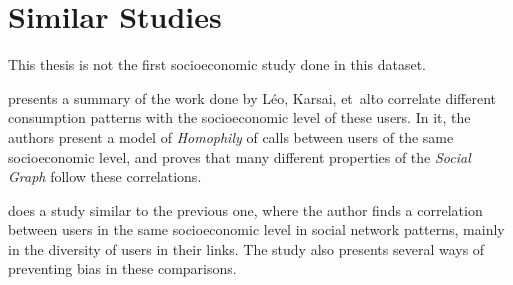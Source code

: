 \section{Similar Studies}

This thesis is not the first socioeconomic study done in this dataset.

 presents a summary of the work done by Léo, Karsai, et\ al\. to correlate different consumption patterns with the socioeconomic level of these users.
In it, the authors present a model of \emph{Homophily} of calls between users of the same socioeconomic level, and proves that many different properties of the \emph{Social Graph} follow these correlations.

 does a study similar to the previous one, where the author finds a correlation between users in the same socioeconomic level in social network patterns, mainly in the diversity of users in their links.
The study also presents several ways of preventing bias in these comparisons.


